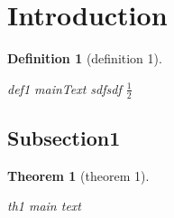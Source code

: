 \documentclass{article}
\newcommand{\depends}[1]{}
\newcommand{\summary}[1]{}
\newcommand{\mainText}[1]{#1}
\newtheorem{theorem}{Theorem}
\newtheorem{definition}{Definition}
\begin{document}
\section{Introduction}
\label{sec:intro}

\begin{definition}[definition 1]
    \label{def:def1}
    \summary{def1 summary qsd}
    \mainText{def1 mainText sdfsdf $\frac{1}{2}$}
\end{definition}

\subsection{Subsection1}
\label{subsec:1}

\begin{theorem}[theorem 1]
    \label{th:th1}
    \depends{def:def1}
    \summary{th1 summary}
    \mainText{th1 main text}
\end{theorem}
\end{document}
